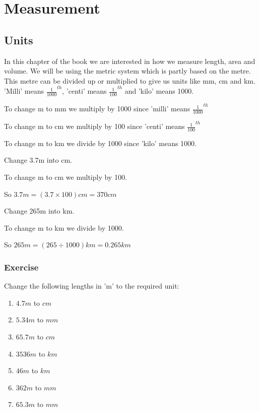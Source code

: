 \chapter{Measurement}
\section{Units}
In this chapter of the book we are interested in how we measure length, area and volume.  We will be using the metric system which is partly based on the metre.  This metre can be divided up or multiplied to give us units like mm, cm and km.  'Milli' means ${\frac{1}{1000}}^{th}$, 'centi' means ${\frac{1}{100}}^{th}$ and 'kilo' means 1000.

\bigskip

To change m to mm we multiply by 1000 since 'milli' means ${\frac{1}{1000}}^{th}$

To change m to cm we multiply by 100 since 'centi' means ${\frac{1}{100}}^{th}$

To change m to km we divide by 1000 since 'kilo' means 1000.

\begin{exmp}
Change 3.7m into cm.

\bigskip

To change m to cm we multiply by 100.

\bigskip

So $3.7m = (3.7 \times 100) cm = 370cm$
\end{exmp}

\begin{exmp}
Change 265m into km.

\bigskip

To change m to km we divide by 1000.

\bigskip

So $265m = (265 \div 1000)km = 0.265km$

\end{exmp}
\subsection{Exercise}
Change the following lengths in 'm' to the required unit:
\begin{enumerate}
	\item $4.7m$ to $cm$
	\item $5.34m$ to $mm$
	\item $65.7m$ to $cm$
	\item $3536m$ to $km$
	\item $46m$ to $km$
	\item $362m$ to $mm$
	\item $65.3m$ to $mm$
\end{enumerate}

